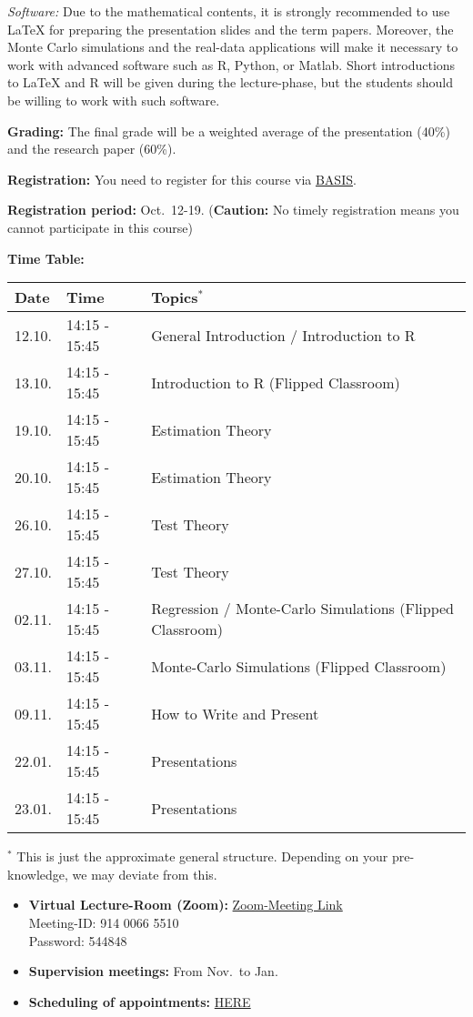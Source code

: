 \documentclass[
]{book}
\begin{document}
\emph{Software:} Due to the mathematical contents, it is strongly recommended to use LaTeX for preparing the presentation slides and the term papers. Moreover, the Monte Carlo simulations and the real-data applications will make it necessary to work with advanced software such as R, Python, or Matlab. Short introductions to LaTeX and R will be given during the lecture-phase, but the students should be willing to work with such software.

\textbf{Grading:} The final grade will be a weighted average of the presentation (40\%) and the research paper (60\%).

\textbf{Registration:} You need to register for this course via \href{https://basis.uni-bonn.de/}{BASIS}.

\textbf{Registration period:} Oct.~12-19. (\textbf{Caution:} No timely registration means you cannot participate in this course)

\hfill\break

\textbf{Time Table:}

\begin{longtable}[]{@{}lll@{}}
\toprule
Date & Time & Topics\(^*\) \\
\midrule
\endhead
12.10. & 14:15 - 15:45 & General Introduction / Introduction to R \\
13.10. & 14:15 - 15:45 & Introduction to R (Flipped Classroom) \\
19.10. & 14:15 - 15:45 & Estimation Theory \\
20.10. & 14:15 - 15:45 & Estimation Theory \\
26.10. & 14:15 - 15:45 & Test Theory \\
27.10. & 14:15 - 15:45 & Test Theory \\
02.11. & 14:15 - 15:45 & Regression / Monte-Carlo Simulations (Flipped Classroom) \\
03.11. & 14:15 - 15:45 & Monte-Carlo Simulations (Flipped Classroom) \\
09.11. & 14:15 - 15:45 & How to Write and Present \\
22.01. & 14:15 - 15:45 & Presentations \\
23.01. & 14:15 - 15:45 & Presentations \\
\bottomrule
\end{longtable}

\(^*\) This is just the approximate general structure. Depending on your pre-knowledge, we may deviate from this.

\begin{itemize}
\item
  \textbf{Virtual Lecture-Room (Zoom):} \href{https://uni-bonn.zoom.us/j/91400665510?pwd=RUl5NW9mMjcyQlk2VkRGbXFrSmJlQT09}{Zoom-Meeting Link}\\
  Meeting-ID: 914 0066 5510\\
  Password: 544848
\item
  \textbf{Supervision meetings:} From Nov.~to Jan.~
\item
  \textbf{Scheduling of appointments:} \href{https://docs.google.com/spreadsheets/d/1clb0ple3GaRlwod5JOKK84A996p1BKNMSs32JrqBZ_A/edit?usp=sharing}{HERE}
\end{itemize}
\end{document}

